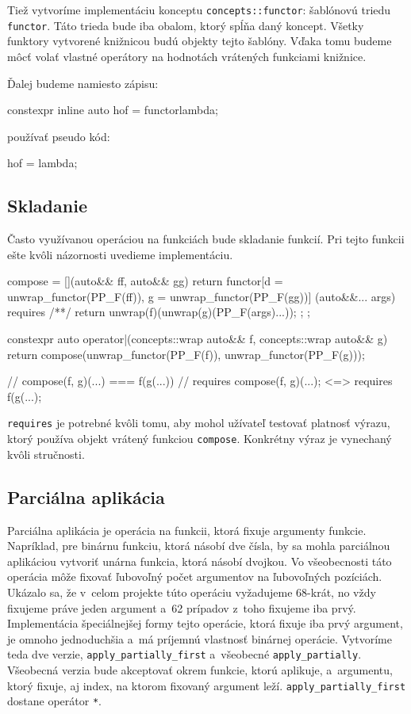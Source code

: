 Tiež vytvoríme implementáciu konceptu \texttt{concepts::functor}: šablónovú trie\-du \texttt{functor}. Táto trieda bude iba obalom, ktorý spĺňa daný koncept. Všetky funktory vytvorené knižnicou budú objekty tejto šablóny. Vďaka tomu budeme môcť volať vlastné operátory na hodnotách vrátených funkciami knižnice.

Ďalej budeme namiesto zápisu:
\begin{code}
constexpr inline auto hof = functor{lambda};
\end{code}
používať pseudo kód:
\begin{code}
hof = lambda;
\end{code}

\subsection{Skladanie}

Často využívanou operáciou na funkciách bude skladanie funkcií. Pri tejto funkcii ešte kvôli názornosti uvedieme implementáciu.
\begin{code}[fontsize=\footnotesize]
compose =
    [](auto&& ff, auto&& gg)
    { return functor{[d = unwrap_functor(PP_F(ff)),
                      g = unwrap_functor(PP_F(gg))]
                     (auto&&... args) requires /**/
                     { return unwrap(f)(unwrap(g)(PP_F(args)...)); }}; };

constexpr auto operator|(concepts::wrap auto&& f, concepts::wrap auto&& g) 
{ return compose(unwrap_functor(PP_F(f)), unwrap_functor(PP_F(g))); }

// compose(f, g)(...) === f(g(...))
// requires { compose(f, g)(...); } <=> requires { f(g(...); }
\end{code}
\texttt{requires} je potrebné kvôli tomu, aby mohol užívateľ testovať platnosť výrazu, ktorý používa objekt vrátený funkciou \texttt{compose}. Konkrétny výraz je vynechaný kvôli stručnosti.

\subsection{Parciálna aplikácia}

Parciálna aplikácia je operácia na funkcii, ktorá fixuje argumenty funkcie. Napríklad, pre binárnu funkciu, ktorá násobí dve čísla, by sa mohla parciálnou aplikáciou vytvoriť unárna funkcia, ktorá násobí dvojkou. Vo všeobecnosti táto operácia môže fixovať ľubovoľný počet argumentov na ľubovoľných pozíciách. Ukázalo sa, že v~celom projekte túto operáciu vyžadujeme 68-krát, no vždy fixujeme práve jeden argument a~62 prípadov z~toho fixujeme iba prvý. Implementácia špeciálnejšej formy tejto operácie, ktorá fixuje iba prvý argument, je omnoho jednoduchšia a~má príjemnú vlastnosť binárnej operácie. Vytvoríme teda dve verzie, \texttt{apply\_partially\_first} a~všeobecné \texttt{apply\_partially}. Všeobecná verzia bude akceptovať okrem funkcie, ktorú aplikuje, a~argumentu, ktorý fixuje, aj index, na ktorom fixovaný argument leží. \texttt{apply\_partially\_first} dostane operátor \texttt{*}.

